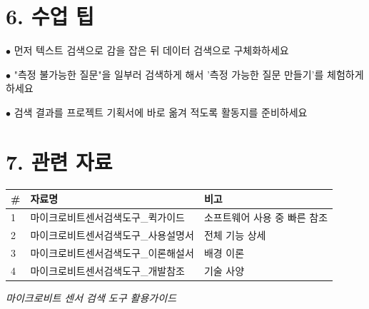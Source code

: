 \documentclass[11pt,a4paper]{article}
\begin{document}
\section*{6. 수업 팁}

$\bullet$  먼저 텍스트 검색으로 감을 잡은 뒤 데이터 검색으로 구체화하세요

$\bullet$  "측정 불가능한 질문"을 일부러 검색하게 해서 '측정 가능한 질문 만들기'를 체험하게 하세요

$\bullet$  검색 결과를 프로젝트 기획서에 바로 옮겨 적도록 활동지를 준비하세요



\section*{7. 관련 자료}

\begin{center}
\renewcommand{\arraystretch}{1.4}
\begin{tabular}{|p{1.5cm}|p{7.1cm}|p{6.4cm}|}
\hline
\rowcolor{tableheader}
\textbf{\#} & \textbf{자료명} & \textbf{비고} \\
\hline
1 & 마이크로비트센서검색도구\_퀵가이드 & 소프트웨어 사용 중 빠른 참조 \\
\hline
2 & 마이크로비트센서검색도구\_사용설명서 & 전체 기능 상세 \\
\hline
3 & 마이크로비트센서검색도구\_이론해설서 & 배경 이론 \\
\hline
4 & 마이크로비트센서검색도구\_개발참조 & 기술 사양 \\
\hline
\end{tabular}
\end{center}


\vfill
\begin{center}
\small\color{lightbrown}
\textit{마이크로비트 센서 검색 도구 활용가이드}
\end{center}
\end{document}
